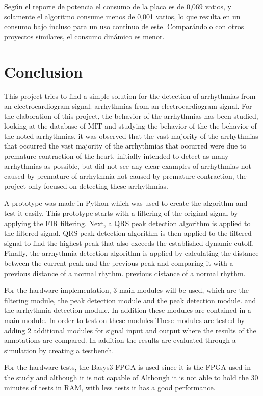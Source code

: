 Según el reporte de potencia el consumo de la placa es de 0,069 vatios, y solamente el algoritmo consume menos de 0,001 vatios, lo que resulta en un consumo bajo incluso para un uso continuo de este. Comparándolo con otros proyectos similares, el consumo dinámico es menor.

\chapter*{Conclusion}

This project tries to find a simple solution for the detection of arrhythmias from an electrocardiogram signal. 
arrhythmias from an electrocardiogram signal. For the elaboration of this project, 
the behavior of the arrhythmias has been studied, looking at the database of MIT and studying the behavior of the
the behavior of the noted arrhythmias, it was observed that the vast majority of the arrhythmias that occurred 
the vast majority of the arrhythmias that occurred were due to premature contraction of the heart.
initially intended to detect as many arrhythmias as possible, but did not see any clear examples of arrhythmias not caused by premature
of arrhythmia not caused by premature contraction, the project only focused on detecting these arrhythmias.

A prototype was made in Python which was used to create the algorithm and test it easily. This prototype starts
with a filtering of the original signal by applying the FIR filtering. Next, a QRS peak detection algorithm is applied to the filtered signal. 
QRS peak detection algorithm is then applied to the filtered signal to find the highest peak that also exceeds the established dynamic cutoff.
Finally, the arrhythmia detection algorithm is applied by calculating the distance between the current peak and the previous peak and comparing it with a previous distance of a normal rhythm.
previous distance of a normal rhythm.

For the hardware implementation, 3 main modules will be used, which are the filtering module, the peak detection module and the peak detection module. 
and the arrhythmia detection module. In addition these modules are contained in a main module. In order to test on these modules
These modules are tested by adding 2 additional modules for signal input and output where the results of the annotations are compared. In addition 
the results are evaluated through a simulation by creating a testbench.

For the hardware tests, the Basys3 FPGA is used since it is the FPGA used in the study and although it is not capable of 
Although it is not able to hold the 30 minutes of tests in RAM, with less tests it has a good performance.

